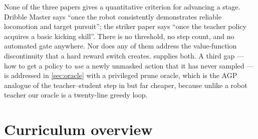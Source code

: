 \documentclass[11pt,a4paper]{article}
\begin{document}
None of the three papers gives a quantitative criterion for advancing a stage. Dribble
Master says ``once the robot consistently demonstrates reliable locomotion and target
pursuit''; the striker paper says ``once the teacher policy acquires a basic kicking
skill''. There is no threshold, no step count, and no automated gate anywhere. Nor does any
of them address the value-function discontinuity that a hard reward switch creates.
 supplies both. A third gap --- how to get a policy to \emph{use} a
newly unmasked action that it has never sampled --- is addressed in \cref{sec:oracle} with a
privileged prune oracle, which is the AGP analogue of the teacher--student step in
\citet{xu2025striker} but far cheaper, because unlike a robot teacher our oracle is a
twenty-line greedy loop.

\section{Curriculum overview}
\end{document}
